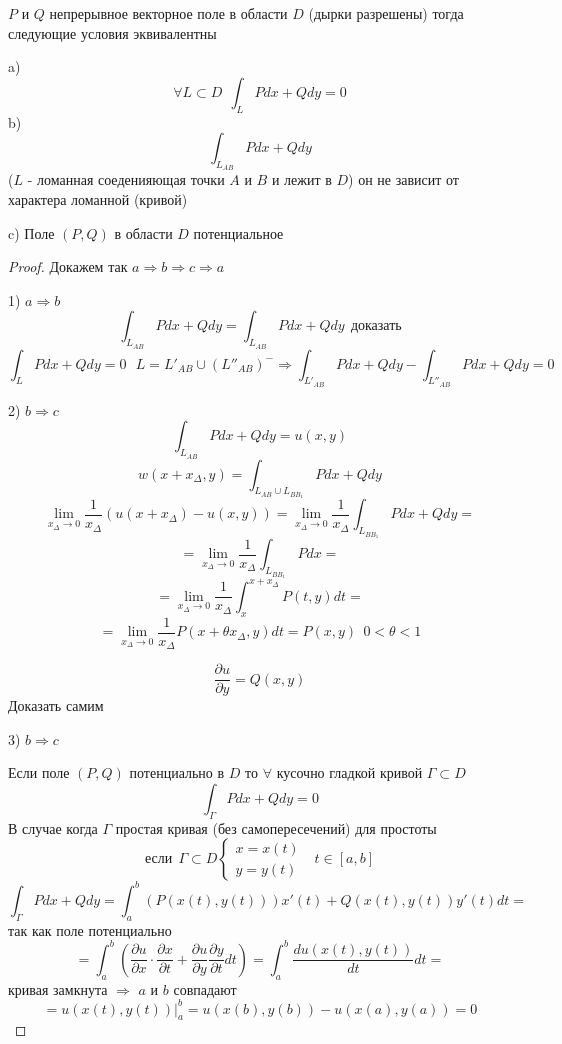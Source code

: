 \begin{theorem}
  $P$ и $Q$ непрерывное векторное поле в области $D$ (дырки разрешены) тогда
  следующие условия эквивалентны

  a)
  $$
  \forall L \subset D ~~ \int_L Pdx + Qdy = 0
  $$
  b)
  $$
  \int_{L_{AB}} Pdx + Qdy
  $$
  ($L$ - ломанная соеденияющая точки $A$ и $B$ и лежит в $D$)
  он не зависит от характера ломанной (кривой)

  c) Поле $(P, Q)$ в области $D$ потенциальное
\end{theorem}

\begin{proof}
  Докажем так $a \Rightarrow b \Rightarrow c \Rightarrow a$

  1) $a \Rightarrow b$
  $$
  \int_{L_{AB}} Pdx + Qdy = \int_{L_{AB}} Pdx + Qdy ~~ \text{доказать}
  $$
  $$
  \int_L Pdx + Qdy = 0 ~~~ L = L'_{AB} \cup (L''_{AB})^- \Rightarrow
  \int_{L'_{AB}} Pdx + Qdy - \int_{L''_{AB}} Pdx + Qdy = 0
  $$

  2) $b \Rightarrow c$
  $$
  \int_{L_{AB}} Pdx + Qdy = u(x,y)
  $$
  $$
  w(x + x_{\Delta}, y) = \int_{L_{AB} \cup L_{BB_1}} Pdx + Qdy
  $$
  $$
  \lim_{x_{\Delta} \to 0} \frac{1}{x_{\Delta}} (u(x + x_{\Delta}) - u(x,y))
  = \lim_{x_{\Delta} \to 0} \frac{1}{x_{\Delta}} \int_{L_{BB_1}} Pdx + Qdy =
  $$
  $$
  = \lim_{x_{\Delta} \to 0} \frac{1}{x_{\Delta}} \int_{L_{BB_1}} Pdx =
  $$
  $$
  = \lim_{x_{\Delta} \to 0} \frac{1}{x_{\Delta}} \int_x^{x+x_{\Delta}}
  P(t, y)dt =
  $$
  $$
  = \lim_{x_{\Delta} \to 0} \frac{1}{x_{\Delta}} P(x + \theta x_{\Delta}, y)dt
  = P(x,y) ~~ 0 < \theta < 1
  $$

  $$
  \frac{\partial u}{\partial y} = Q(x,y)
  $$
  Доказать самим

  3) $b \Rightarrow c$

  Если поле $(P, Q)$ потенциально в $D$ то $\forall$ кусочно гладкой кривой
  $\Gamma \subset D$
  $$
  \int_{\Gamma} P dx + Q dy = 0
  $$
  В случае когда $\Gamma$ простая кривая (без самопересечений) для простоты
  $$
  \text{если} ~~ \Gamma \subset D
  \left\{
  \begin{array}{l}
    x = x(t) \\
    y = y(t)
  \end{array}
  \right.
  ~~~ t \in [a,b]
  $$
  $$
  \int_{\Gamma} Pdx + Qdy = \int_a^b (P(x(t), y(t)))x'(t) +
  Q(x(t), y(t))y'(t)dt =
  $$
  так как поле потенциально
  $$
  = \int_a^b \left( \frac{\partial u}{\partial x} \cdot
  \frac{\partial x}{\partial t} + \frac{\partial u}{\partial y}
  \frac{\partial y}{\partial t} dt \right) = \int_a^b
  \frac{du(x(t), y(t))}{dt} dt =
  $$
  кривая замкнута $\Rightarrow$ $a$ и $b$ совпадают
  $$
  = u(x(t), y(t))|_a^b = u(x(b), y(b)) - u(x(a), y(a)) = 0
  $$
\end{proof}


